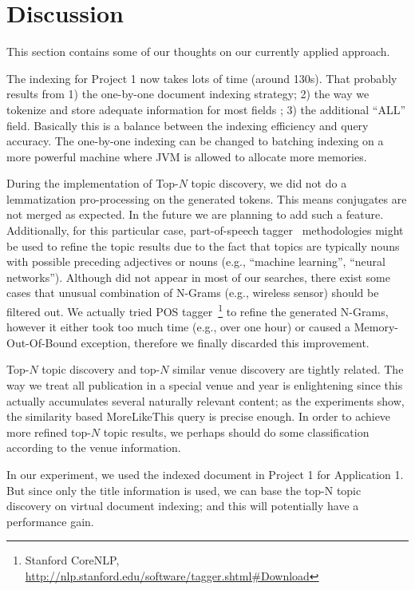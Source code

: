 \section{Discussion}\label{sec:discuss}
This section contains some of our thoughts on our currently applied approach.

The indexing for Project 1 now takes lots of time (around 130s). That probably results from 1) the one-by-one document indexing strategy; 2) the way we tokenize and store adequate information for most fields ; 3) the additional ``ALL'' field. Basically this is a balance between the indexing efficiency and query accuracy.  The one-by-one indexing can be changed to batching indexing on a more powerful machine where JVM is allowed to allocate more memories.

During the implementation of Top-$N$ topic discovery, we did not do a lemmatization pro-processing on the generated tokens. This means conjugates are not merged as expected. In the future we are planning to add such a feature. Additionally, for this particular case, part-of-speech tagger~\cite{pos_tagger} methodologies might be used to refine the topic results due to the fact that topics are typically nouns with possible preceding adjectives or nouns (e.g., ``machine learning'', ``neural networks''). Although did not appear in most of our searches, there exist some cases that unusual combination of N-Grams (e.g., \textsf{wireless sensor}) should be filtered out.  We actually tried POS tagger~\footnote{Stanford CoreNLP, \url{http://nlp.stanford.edu/software/tagger.shtml\#Download}} to refine the generated N-Grams, however it either took too much time (e.g., over one hour) or caused a Memory-Out-Of-Bound exception, therefore we finally discarded this improvement.

Top-$N$ topic discovery and top-$N$ similar venue discovery are tightly related. The way we treat all publication in a special venue and year is enlightening since this actually accumulates several naturally relevant content; as the experiments show, the similarity based \textsf{MoreLikeThis} query is precise enough. In order to achieve more refined top-$N$ topic results, we perhaps should do some classification  according to the venue information.

In our experiment, we used the indexed document in Project 1 for Application 1. But since only the title information is used, we can base the top-N topic discovery on virtual document indexing; and this will potentially have a performance gain.